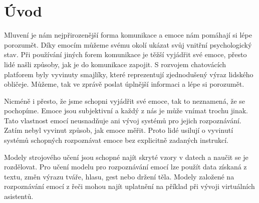 \documentclass[FM,BP]{tulthesis}
\begin{document}

\begin{abstractCZ}
\end{abstractCZ}

\begin{keywordsCZ}
\end{keywordsCZ}

\vspace{2cm}

\begin{abstractEN}
\end{abstractEN}

\begin{keywordsEN}
\end{keywordsEN}

\clearpage

\begin{acknowledgement}
\end{acknowledgement}

\tableofcontents

\clearpage

\begin{abbrList}
\end{abbrList}

\chapter{Úvod}
Mluvení je nám nejpřirozenější forma komunikace a emoce nám pomáhají si lépe porozumět. Díky emocím můžeme svému okolí ukázat svůj vnitřní psychologický stav. Při používání jiných forem komunikace je těžší vyjádřit své emoce, přesto lidé našli způsoby, jak je do komunikace zapojit. S rozvojem chatovácích platforem byly vyvinuty smajlíky, které reprezentují zjednodušený výraz lidského obličeje. Můžeme, tak ve zprávě poslat úplnější informaci a lépe si porozumět.\cite{DBLP:journals/speech/AkcayO20}

Nicméně i přesto, že jsme schopni vyjádřit své emoce, tak to neznamená, že se pochopíme. Emoce jsou subjektivní a každý z nás je může vnímat trochu jinak. Tato vlastnost emocí neusnadňuje ani vývoj systémů pro jejich rozpoznávání. Zatím nebyl vyvinut způsob, jak emoce měřit. Proto lidé usilují o vyvinutí systémů schopných rozpoznávat emoce bez explicitně zadaných instrukcí.

Modely strojového učení jsou schopné najít skryté vzory v datech a naučit se je rozdělovat. Pro učení modelu pro rozpoznávání emocí lze použít data získaná z textu, změn výrazu tváře, hlasu, gest nebo držení těla.\cite{konar_chakraborty_2015} Modely založené na rozpoznávání emocí z řeči mohou najít uplatnění na příklad při vývoji virtuálních asistentů. 
\end{document}
